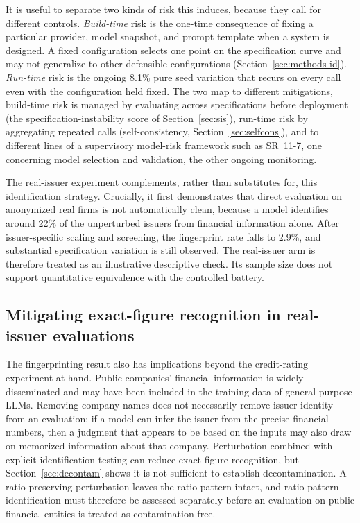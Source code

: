 \documentclass[a4paper,fleqn]{cas-sc}
\begin{document}
It is useful to separate two kinds of risk this induces, because they call for different controls.
\emph{Build-time} risk is the one-time consequence of fixing a particular provider, model snapshot, and
prompt template when a system is designed. A fixed configuration selects one point on the specification
curve and may not generalize to other defensible configurations (Section~\ref{sec:methods-id}). \emph{Run-time} risk is
the ongoing 8.1\% pure seed variation that recurs on every call even with the configuration held fixed.
The two map to different mitigations, build-time risk is managed by evaluating across specifications
before deployment (the specification-instability score of Section~\ref{sec:sis}), run-time risk by
aggregating repeated calls (self-consistency, Section~\ref{sec:selfcons}), and to different lines of a
supervisory model-risk framework such as SR~11-7, one concerning model selection and validation, the
other ongoing monitoring.

The real-issuer experiment complements, rather than substitutes for, this identification strategy.
Crucially, it first demonstrates that direct evaluation on anonymized real firms is not automatically clean, because a model identifies around 22\% of the unperturbed issuers from financial information alone. After
issuer-specific scaling and screening, the fingerprint rate falls to 2.9\%, and substantial
specification variation is still observed. The real-issuer arm is therefore treated as an illustrative
descriptive check. Its sample size does not support quantitative equivalence with the controlled battery.

\subsection{Mitigating exact-figure recognition in real-issuer evaluations}
The fingerprinting result also has implications beyond the credit-rating experiment at hand. Public
companies' financial information is widely disseminated and may have been included in the training data
of general-purpose LLMs. Removing company names does not necessarily remove issuer identity from an
evaluation: if a model can infer the issuer from the precise financial numbers, then a judgment that
appears to be based on the inputs may also draw on memorized information about that company. Perturbation combined with explicit identification testing can reduce exact-figure recognition,
but Section~\ref{sec:decontam} shows it is not sufficient to establish decontamination. A
ratio-preserving perturbation leaves the ratio pattern intact, and ratio-pattern identification must
therefore be assessed separately before an evaluation on public financial entities is treated as
contamination-free.
\end{document}
